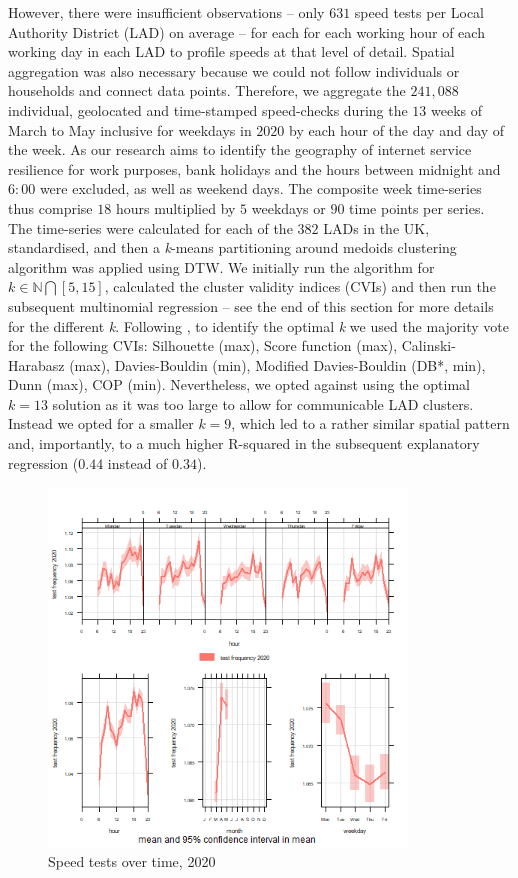 \documentclass[]{interact}
\theoremstyle{plain}%
\theoremstyle{definition}
\theoremstyle{remark}
\begin{document}
However, there were insufficient observations -- only \(631\) speed
tests per Local Authority District (LAD) on average -- for each for each
working hour of each working day in each LAD to profile speeds at that
level of detail. Spatial aggregation was also necessary because we could
not follow individuals or households and connect data points. Therefore,
we aggregate the \(241,088\) individual, geolocated and time-stamped
speed-checks during the \(13\) weeks of March to May inclusive for
weekdays in \(2020\) by each hour of the day and day of the week. As our
research aims to identify the geography of internet service resilience
for work purposes, bank holidays and the hours between midnight and
\(6:00\) were excluded, as well as weekend days. The composite week
time-series thus comprise \(18\) hours multiplied by \(5\) weekdays or
\(90\) time points per series. The time-series were calculated for each
of the \(382\) LADs in the UK, standardised, and then a \emph{k}-means
partitioning around medoids clustering algorithm was applied using DTW.
We initially run the algorithm for \(k \in \mathbb{N} \bigcap [5,15]\),
calculated the cluster validity indices (CVIs) and then run the
subsequent multinomial regression -- see the end of this section for
more details for the different \emph{k}. Following \citet{sardatime}, to
identify the optimal \emph{k} we used the majority vote for the
following CVIs: Silhouette (max), Score function (max),
Calinski-Harabasz (max), Davies-Bouldin (min), Modified Davies-Bouldin
(DB*, min), Dunn (max), COP (min). Nevertheless, we opted against using
the optimal \(k = 13\) solution as it was too large to allow for
communicable LAD clusters. Instead we opted for a smaller \(k = 9\),
which led to a rather similar spatial pattern and, importantly, to a
much higher R-squared in the subsequent explanatory regression (\(0.44\)
instead of \(0.34\)).

\begin{figure}
\centering
\includegraphics[width=0.85\textwidth,height=0.5\textheight]{figures/time.var.plot2020.png}
\caption{Speed tests over time, 2020 \label{test2020}}
\end{figure}
\end{document}
